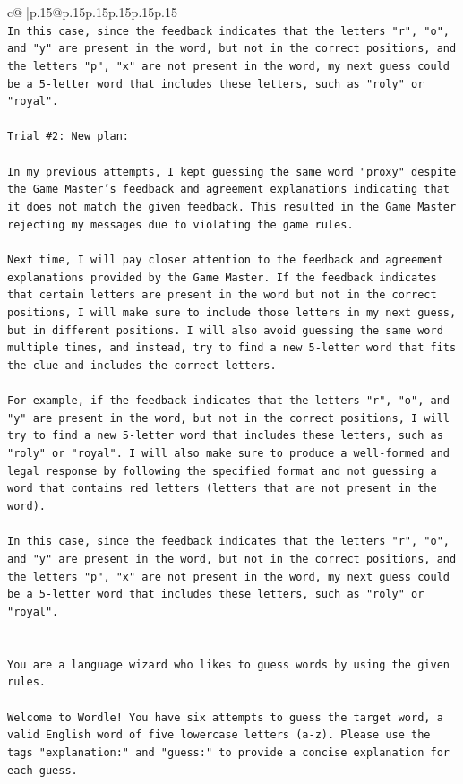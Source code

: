 \documentclass{article}
\begin{document}
{\begin{supertabular}{c@{$\;$}|p{.15\linewidth}@{}p{.15\linewidth}p{.15\linewidth}p{.15\linewidth}p{.15\linewidth}p{.15\linewidth}}
{{{\\ 
\texttt{In this case, since the feedback indicates that the letters "r", "o", and "y" are present in the word, but not in the correct positions, and the letters "p", "x" are not present in the word, my next guess could be a 5{-}letter word that includes these letters, such as "roly" or "royal".} \\
\\ 
\texttt{Trial \#2: New plan: } \\
\\ 
\texttt{In my previous attempts, I kept guessing the same word "proxy" despite the Game Master's feedback and agreement explanations indicating that it does not match the given feedback. This resulted in the Game Master rejecting my messages due to violating the game rules. } \\
\\ 
\texttt{Next time, I will pay closer attention to the feedback and agreement explanations provided by the Game Master. If the feedback indicates that certain letters are present in the word but not in the correct positions, I will make sure to include those letters in my next guess, but in different positions. I will also avoid guessing the same word multiple times, and instead, try to find a new 5{-}letter word that fits the clue and includes the correct letters. } \\
\\ 
\texttt{For example, if the feedback indicates that the letters "r", "o", and "y" are present in the word, but not in the correct positions, I will try to find a new 5{-}letter word that includes these letters, such as "roly" or "royal". I will also make sure to produce a well{-}formed and legal response by following the specified format and not guessing a word that contains red letters (letters that are not present in the word). } \\
\\ 
\texttt{In this case, since the feedback indicates that the letters "r", "o", and "y" are present in the word, but not in the correct positions, and the letters "p", "x" are not present in the word, my next guess could be a 5{-}letter word that includes these letters, such as "roly" or "royal".} \\
\\ 
\\ 
\texttt{You are a language wizard who likes to guess words by using the given rules.} \\
\\ 
\texttt{Welcome to Wordle! You have six attempts to guess the target word, a valid English word of five lowercase letters (a{-}z). Please use the tags "explanation:" and "guess:" to provide a concise explanation for each guess.} \\
}}}
\end{supertabular}}
\end{document}
